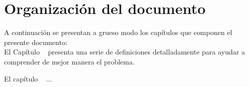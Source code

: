 \section{Organizaci\'on del documento}
\label{intro:organizacion}
A continuación se presentan a grueso modo los capítulos que componen el presente documento:\\

El Capítulo ~ presenta una serie de definiciones detalladamente para ayudar a comprender de mejor manera el problema.

El capítulo ~ ...